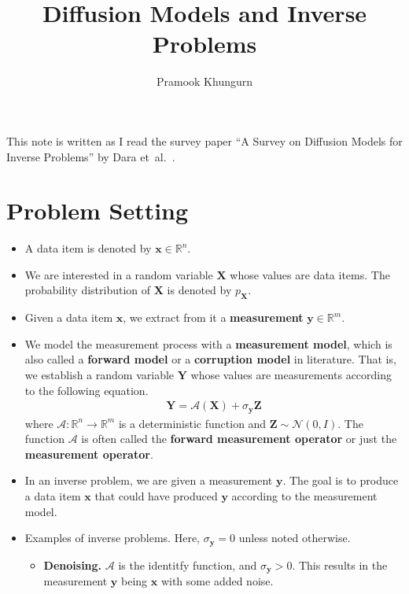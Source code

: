 \documentclass[10pt]{article}
\title{Diffusion Models and Inverse Problems}
\author{Pramook Khungurn}
\newcommand{\ve}[1]{\mathbf{#1}}
\newcommand{\etal}{{et~al.}}
\newcommand{\ra}{\rightarrow}
\newcommand{\mcal}[1]{\mathcal{#1}}
\newcommand{\Real}{\mathbb{R}}
\begin{document}
\maketitle

This note is written as I read the survey paper ``A Survey on Diffusion Models for Inverse Problems'' by Dara \etal~\cite{Daras:2024}.

\section{Problem Setting}

\begin{itemize}
  \item A data item is denoted by $\ve{x} \in \Real^n$.
  
  \item We are interested in a random variable $\ve{X}$ whose values are data items. The probability distribution of $\ve{X}$ is denoted by $p_{\ve{X}}$.
  
  \item Given a data item $\ve{x}$, we extract from it a \textbf{measurement} $\ve{y} \in \Real^m$.
  
  \item We model the measurement process with a \textbf{measurement model}, which is also called a \textbf{forward model} or a \textbf{corruption model} in literature. That is, we establish a random variable $\ve{Y}$ whose values are measurements according to the following equation.
  \begin{align*}
    \ve{Y} = \mcal{A}(\ve{X}) + \sigma_{\ve{y}} \ve{Z}
  \end{align*}
  where $\mcal{A}: \Real^n \ra \Real^m$ is a deterministic function and $\ve{Z} \sim \mcal{N}(0,I)$. The function $\mcal{A}$ is often called the \textbf{forward measurement operator} or just the \textbf{measurement operator}.

  \item In an inverse problem, we are given a measurement $\ve{y}$. The goal is to produce a data item $\ve{x}$ that could have produced $\ve{y}$ according to the measurement model.

  \item Examples of inverse problems. Here, $\sigma_{\ve{y}} = 0$ unless noted otherwise.
  \begin{itemize}
    \item {\bf Denoising.} $\mcal{A}$ is the identitfy function, and $\sigma_{\ve{y}} > 0$. This results in the measurement $\ve{y}$ being $\ve{x}$ with some added noise.
    

\end{itemize}
\end{itemize}
\end{document}
